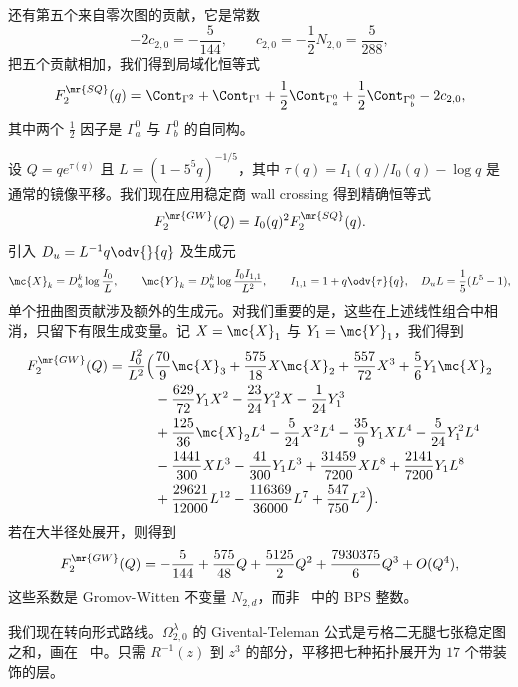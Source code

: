 还有第五个来自零次图的贡献，它是常数
\[ -2c_{2,0} = -\frac{5}{144}, \qquad c_{2,0} = -\frac{1}{2}N_{2,0} = \frac{5}{288}, \]
把五个贡献相加，我们得到局域化恒等式
\[ F_2^{\mr{SQ}}(q) = \Cont_{\Gamma^2} + \Cont_{\Gamma^1} + \frac{1}{2}\Cont_{\Gamma_a^0} + \frac{1}{2}\Cont_{\Gamma_b^0} - 2c_{2,0}, \]
其中两个 \(\frac{1}{2}\) 因子是 \(\Gamma_a^0\) 与 \(\Gamma_b^0\) 的自同构。

设 \(Q = qe^{\tau(q)}\) 且 \(L = (1-5^5q)^{-1/5}\)，其中 \(\tau(q) = I_1(q)/I_0(q) - \log q\) 是通常的镜像平移。我们现在应用稳定商 wall crossing 得到精确恒等式
\[ F_2^{\mr{GW}}(Q) = I_0(q)^2 F_2^{\mr{SQ}}(q). \]
引入 \(D_u = L^{-1}q\odv{}{q}\) 及生成元
\[ \mc{X}_k = D_u^k \log \frac{I_0}{L}, \qquad \mc{Y}_k = D_u^k \log \frac{I_0I_{1,1}}{L^2}, \qquad I_{1,1} = 1 + q \odv{\tau}{q}, \quad D_u L = \frac{1}{5}(L^5-1), \]
单个扭曲图贡献涉及额外的生成元。对我们重要的是，这些在上述线性组合中相消，只留下有限生成变量。记 \(X = \mc{X}_1\) 与 \(Y_1 = \mc{Y}_1\)，我们得到
\begin{align*}
    F^{\mr{GW}}_2(Q) = \frac{I_0^2}{L^2}\Big(&\frac{70}{9}\mc{X}_3 + \frac{575}{18}X\mc{X}_2 + \frac{557}{72}X^3 + \frac{5}{6}Y_1\mc{X}_2 \\
    &- \frac{629}{72}Y_1X^2 - \frac{23}{24}Y_1^2 X - \frac{1}{24}Y_1^3 \\
    &+ \frac{125}{36}\mc{X}_2 L^4 - \frac{5}{24}X^2L^4 - \frac{35}{9}Y_1XL^4 - \frac{5}{24}Y_1^2L^4 \\
    &- \frac{1441}{300}XL^3 - \frac{41}{300}Y_1L^3 + \frac{31459}{7200}XL^8 + \frac{2141}{7200}Y_1L^8 \\
    &+ \frac{29621}{12000}L^{12} - \frac{116369}{36000}L^7 + \frac{547}{750}L^2\Big).
\end{align*}
若在大半径处展开，则得到
\[ F_2^{\mr{GW}}(Q) = -\frac{5}{144} + \frac{575}{48}Q + \frac{5125}{2}Q^2 + \frac{7930375}{6}Q^3 + O(Q^4), \]
这些系数是 Gromov-Witten 不变量 \(N_{2,d}\)，而非~ 中的 BPS 整数。

我们现在转向形式路线。\(\Omega^{\lambda}_{2,0}\) 的 Givental-Teleman 公式是亏格二无腿七张稳定图之和，画在~ 中。只需 \(R^{-1}(z)\) 到 \(z^3\) 的部分，平移把七种拓扑展开为 \(17\) 个带装饰的层。


